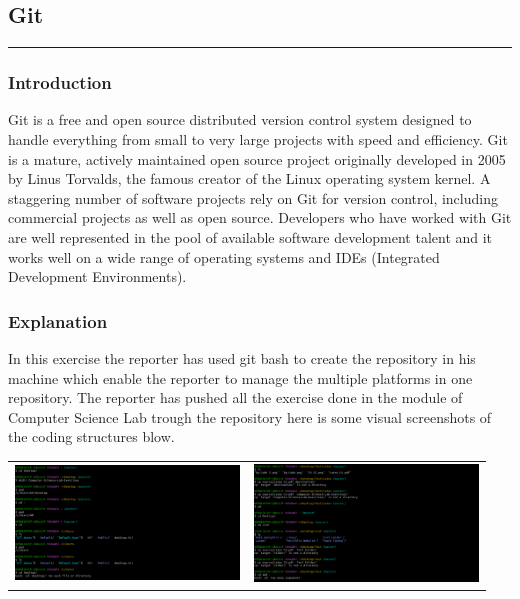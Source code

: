 \documentclass[12pt, A4]{report}
\begin{document}
\subsection{Git}
\rule{\textwidth}{0.1pt}
\subsubsection{Introduction}
Git is a free and open source distributed version control system designed to handle everything from small to very large projects with speed and efficiency. Git is a mature, actively maintained open source project originally developed in 2005 by Linus Torvalds, the famous creator of the Linux operating system kernel. A staggering number of software projects rely on Git for version control, including commercial projects as well as open source. Developers who have worked with Git are well represented in the pool of available software development talent and it works well on a wide range of operating systems and IDEs (Integrated Development Environments).
\subsubsection{Explanation}
In this exercise the reporter has used git bash to create the repository in his machine which enable the reporter to manage the multiple platforms in one repository. The reporter has pushed all the exercise done in the module of Computer Science Lab trough the repository here is some visual screenshots of the coding structures blow.
\vspace{10mm}
\\
\begin{tabular}{cc}
  \includegraphics[width=225,height=0.35\textheight]{Git 1.png}
  &
  \includegraphics[width=225,height=0.35\textheight]{Git 2.png}
 
 \end{tabular}
\end{document}
